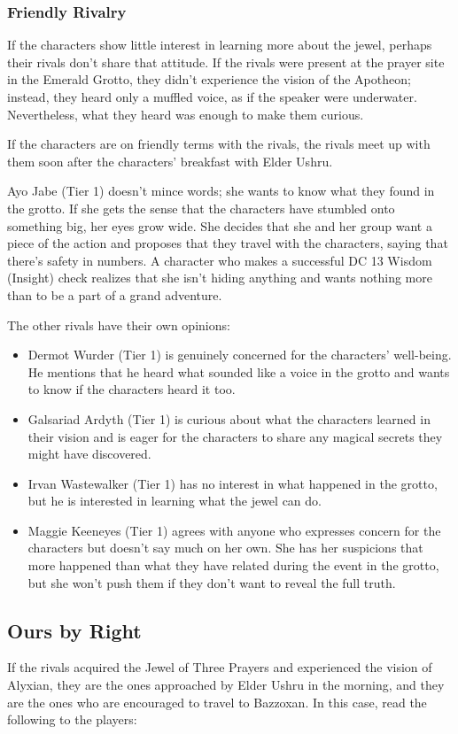 \documentclass[10pt,a4paper,twoside,bg=print,twocolumn,openany,nodeprecatedcode]{dndbook}
\begin{document}
\subsubsection{Friendly Rivalry}
If the characters show little interest in learning more about the jewel, perhaps their rivals don't share that attitude. If the rivals were present at the prayer site in the Emerald Grotto, they didn't experience the vision of the Apotheon; instead, they heard only a muffled voice, as if the speaker were underwater. Nevertheless, what they heard was enough to make them curious.

If the characters are on friendly terms with the rivals, the rivals meet up with them soon after the characters' breakfast with Elder Ushru.

Ayo Jabe (Tier 1) doesn't mince words; she wants to know what they found in the grotto. If she gets the sense that the characters have stumbled onto something big, her eyes grow wide. She decides that she and her group want a piece of the action and proposes that they travel with the characters, saying that there's safety in numbers. A character who makes a successful DC 13 Wisdom (Insight) check realizes that she isn't hiding anything and wants nothing more than to be a part of a grand adventure.

The other rivals have their own opinions:


\begin{itemize}
\item Dermot Wurder (Tier 1) is genuinely concerned for the characters' well-being. He mentions that he heard what sounded like a voice in the grotto and wants to know if the characters heard it too.
\item Galsariad Ardyth (Tier 1) is curious about what the characters learned in their vision and is eager for the characters to share any magical secrets they might have discovered.
\item Irvan Wastewalker (Tier 1) has no interest in what happened in the grotto, but he is interested in learning what the jewel can do.
\item Maggie Keeneyes (Tier 1) agrees with anyone who expresses concern for the characters but doesn't say much on her own. She has her suspicions that more happened than what they have related during the event in the grotto, but she won't push them if they don't want to reveal the full truth.
\end{itemize}

\subsection{Ours by Right}
If the rivals acquired the Jewel of Three Prayers and experienced the vision of Alyxian, they are the ones approached by Elder Ushru in the morning, and they are the ones who are encouraged to travel to Bazzoxan. In this case, read the following to the players:
\end{document}
